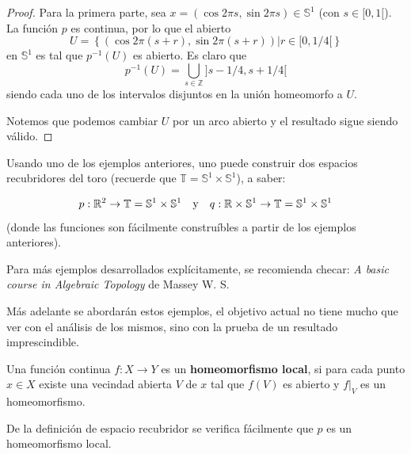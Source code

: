 \documentclass[12pt]{report}
\theoremstyle{largebreak}
\newcommand\cf[3]{\ensuremath{#1:#2\rightarrow#3}}
\begin{document}
    \begin{proof}
        Para la primera parte, sea $x=(\cos2\pi s,\sin2\pi s)\in\mathbb{S}^1$ (con $s\in[0,1[$). La función $p$ es continua, por lo que el abierto
        \begin{equation*}
            U=\left\{(\cos2\pi(s+r),\sin2\pi (s+r))\Big|r\in[0,1/4[ \right\}
        \end{equation*}
        en $\mathbb{S}^1$ es tal que $p^{-1}(U)$ es abierto. Es claro que
        \begin{equation*}
            p^{-1}(U)=\bigcup_{ s\in\mathbb{Z}}]s-1/4,s+1/4[
        \end{equation*}
        siendo cada uno de los intervalos disjuntos en la unión homeomorfo a $U$.

        Notemos que podemos cambiar $U$ por un arco abierto y el resultado sigue siendo válido. 
    \end{proof}

    Usando uno de los ejemplos anteriores, uno puede construir dos espacios recubridores del toro (recuerde que $\mathbb{T}=\mathbb{S}^1\times\mathbb{S}^1$), a saber:

    \begin{equation*}
        \cf{p}{\mathbb{R}^2}{\mathbb{T}=\mathbb{S}^1\times\mathbb{S}^1}\quad\textup{y}\quad\cf{q}{\mathbb{R}\times\mathbb{S}^1}{\mathbb{T}=\mathbb{S}^1\times\mathbb{S}^1}
    \end{equation*}
    (donde las funciones son fácilmente construíbles a partir de los ejemplos anteriores).

    \begin{obs}
        Para más ejemplos desarrollados explícitamente, se recomienda checar: \textit{A basic course in Algebraic Topology} de Massey W. S.

        Más adelante se abordarán estos ejemplos, el objetivo actual no tiene mucho que ver con el análisis de los mismos, sino con la prueba de un resultado imprescindible.
    \end{obs}

    \begin{mydef}
        Una función continua $\cf{f}{X}{Y}$ es un \textbf{homeomorfismo local}, si para cada punto $x\in X$ existe una vecindad abierta $V$ de $x$ tal que $f(V)$ es abierto y $f\big|_{V}$ es un homeomorfismo.
    \end{mydef}

    \begin{obs}
        De la definición de espacio recubridor se verifica fácilmente que $p$ es un homeomorfismo local.
    \end{obs}
\end{document}
